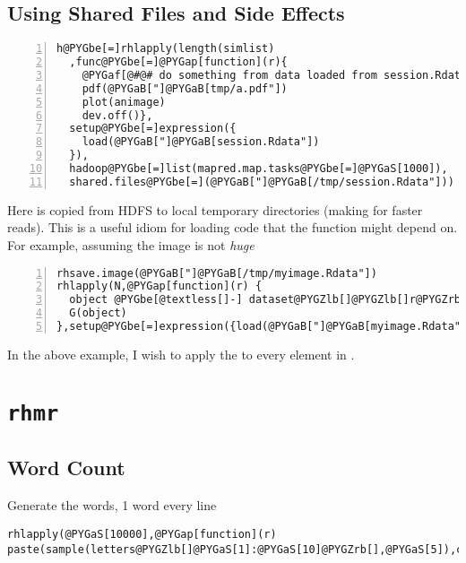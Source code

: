 \documentclass[letterpaper,10pt,english]{manual}
\begin{document}
\subsection{Using Shared Files and Side Effects}

\begin{Verbatim}[commandchars=@\[\],numbers=left,firstnumber=1,stepnumber=1]
h@PYGbe[=]rhlapply(length(simlist)
  ,func@PYGbe[=]@PYGap[function](r){
    @PYGaf[@#@# do something from data loaded from session.Rdata]
    pdf(@PYGaB["]@PYGaB[tmp/a.pdf"])
    plot(animage)
    dev.off()},
  setup@PYGbe[=]expression({
    load(@PYGaB["]@PYGaB[session.Rdata"])
  }),
  hadoop@PYGbe[=]list(mapred.map.tasks@PYGbe[=]@PYGaS[1000]),
  shared.files@PYGbe[=](@PYGaB["]@PYGaB[/tmp/session.Rdata"]))
\end{Verbatim}

Here  is copied from HDFS to local temporary directories (making for faster reads). This
is a useful idiom for loading code that the  function might depend on. For example, assuming the image is not \emph{huge}

\begin{Verbatim}[commandchars=@\[\],numbers=left,firstnumber=1,stepnumber=1]
rhsave.image(@PYGaB["]@PYGaB[/tmp/myimage.Rdata"])
rhlapply(N,@PYGap[function](r) {
  object @PYGbe[@textless[]-] dataset@PYGZlb[]@PYGZlb[]r@PYGZrb[]@PYGZrb[]
  G(object)
},setup@PYGbe[=]expression({load(@PYGaB["]@PYGaB[myimage.Rdata"])}))
\end{Verbatim}

In the above example, I wish to apply the  to every element in .


\section{\texttt{rhmr}}


\subsection{Word Count}

Generate the words, 1 word every line

\begin{Verbatim}[commandchars=@\[\]]
rhlapply(@PYGaS[10000],@PYGap[function](r) paste(sample(letters@PYGZlb[]@PYGaS[1]:@PYGaS[10]@PYGZrb[],@PYGaS[5]),collapse@PYGbe[=]@PYGaB["]@PYGaB["]),output.folder@PYGbe[=]'@PYGbe[/]tmp@PYGbe[/]words')
\end{Verbatim}
\end{document}
